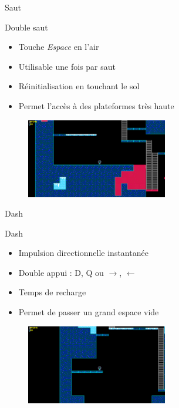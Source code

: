 \documentclass{beamer}
\begin{document}
{\begin{frame}{Saut}
    
    \begin{block}{Double saut}
        \begin{itemize}
            \item[\bullet] Touche \emph{Espace} en l'air
            \item[\bullet] Utilisable une fois par saut
            \item[\bullet] Réinitialisation en touchant le sol
            \item[\bullet] Permet l'accès à des plateformes très haute
        \end{itemize}
    \end{block}
    \begin{figure}
        \centering
        \includegraphics[width=0.55\textwidth]{images/double_jump_ex.png}
    \end{figure}
\end{frame}

\begin{frame}{Dash}
    \begin{block}{Dash}
        \begin{itemize}
            \item[\bullet] Impulsion directionnelle instantanée
            \item[\bullet] Double appui : D, Q ou $\rightarrow$, $\leftarrow$
            \item[\bullet] Temps de recharge
            \item[\bullet] Permet de passer un grand espace vide
            
        \end{itemize}
    \end{block}
    \begin{figure}
        \centering
        \includegraphics[width=0.55\textwidth]{images/dash_ex.png}
    \end{figure}
\end{frame}

}
\end{document}
